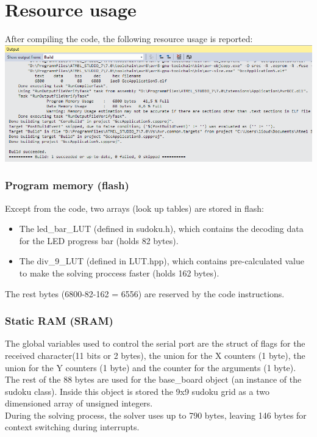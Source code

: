 \documentclass[12pt, a4, hidelinks]{article}
\begin{document}
\section*{Resource usage}
After compiling the code, the following resource usage is reported: \\
\includegraphics[width = \textwidth]{RESOURCES.png} 

\subsubsection*{Program memory (flash)}
Except from the code, two arrays (look up tables) are stored in flash: 
\begin{itemize}
\item The led\_bar\_LUT (defined in sudoku.h), which contains the decoding data for the LED progress bar (holds 82 bytes).
\item The div\_9\_LUT (defined in LUT.hpp), which contains pre-calculated value to make the solving proccess faster (holds 162 bytes).
\end{itemize}
The rest bytes (6800-82-162 = 6556) are reserved by the code instructions.

\subsubsection*{Static RAM (SRAM)}
The global variables used to control the serial port are the struct of flags for the received character(11 bits or 2 bytes), the union for the X counters (1 byte), the union for the Y counters (1 byte) and the counter for the arguments (1 byte). The rest of the 88 bytes are used for the base\_board object (an instance of the sudoku class). Inside this object is stored the 9x9 sudoku grid as a two dimensioned array of unsigned integers. \\
During the solving process, the solver uses up to 790 bytes, leaving 146 bytes for context switching during interrupts.
\end{document}

